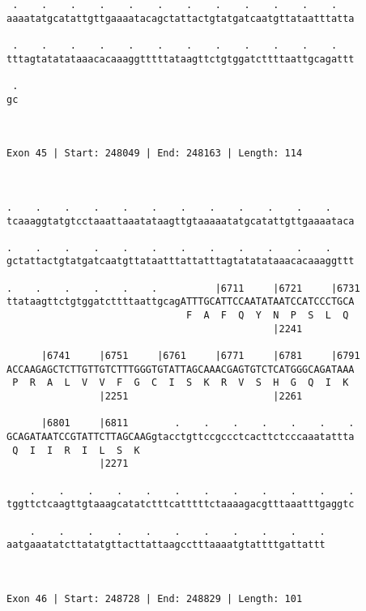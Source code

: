 \documentclass{article}
\begin{document}
\begin{Verbatim}
 .    .    .    .    .    .    .    .    .    .    .    .   
aaaatatgcatattgttgaaaatacagctattactgtatgatcaatgttataatttatta
                                                            
 .    .    .    .    .    .    .    .    .    .    .    .   
tttagtatatataaacacaaaggtttttataagttctgtggatcttttaattgcagattt
                                                            
 .
gc
  
  
 
Exon 45 | Start: 248049 | End: 248163 | Length: 114



.    .    .    .    .    .    .    .    .    .    .    .    
tcaaaggtatgtcctaaattaaatataagttgtaaaaatatgcatattgttgaaaataca
                                                            
.    .    .    .    .    .    .    .    .    .    .    .    
gctattactgtatgatcaatgttataatttattatttagtatatataaacacaaaggttt
                                                            
.    .    .    .    .    .          |6711     |6721     |6731
ttataagttctgtggatcttttaattgcagATTTGCATTCCAATATAATCCATCCCTGCA
                               F  A  F  Q  Y  N  P  S  L  Q 
                                              |2241         
  
      |6741     |6751     |6761     |6771     |6781     |6791
ACCAAGAGCTCTTGTTGTCTTTGGGTGTATTAGCAAACGAGTGTCTCATGGGCAGATAAA
 P  R  A  L  V  V  F  G  C  I  S  K  R  V  S  H  G  Q  I  K 
                |2251                         |2261         
  
      |6801     |6811        .    .    .    .    .    .    .
GCAGATAATCCGTATTCTTAGCAAGgtacctgttccgccctcacttctcccaaatattta
 Q  I  I  R  I  L  S  K                                     
                |2271                                       
  
    .    .    .    .    .    .    .    .    .    .    .    .
tggttctcaagttgtaaagcatatctttcatttttctaaaagacgtttaaatttgaggtc
                                                            
    .    .    .    .    .    .    .    .    .    .    .
aatgaaatatcttatatgttacttattaagcctttaaaatgtattttgattattt
                                                       
                                                       
 
Exon 46 | Start: 248728 | End: 248829 | Length: 101




\end{Verbatim}
\end{document}
